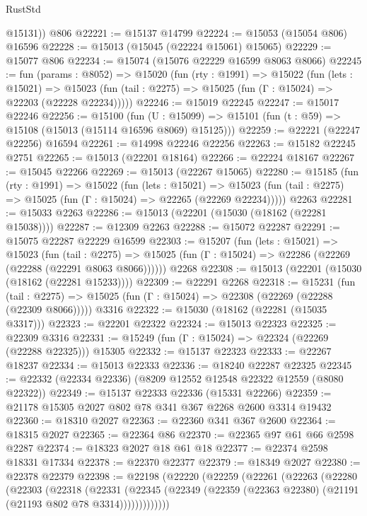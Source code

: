 \begin{lexlean}{RustStd}
\begin{coremodule}
        @15131))
    @806
@22221 := @15137 @14799
@22224 := @15053 (@15054 @806) @16596
@22228 := @15013 (@15045 (@22224 @15061) @15065)
@22229 := @15077 @806
@22234 := @15074 (@15076 @22229 @16599 @8063 @8066)
@22245 := fun (params : @8052) =>
  @15020
    (fun (rty : @1991) =>
    @15022
      (fun (lets : @15021) =>
      @15023 (fun (tail : @2275) => @15025 (fun (Γ : @15024) => @22203 (@22228 @22234)))))
@22246 := @15019 @22245
@22247 := @15017 @22246
@22256 := @15100
    (fun (U : @15099) => @15101 (fun (t : @59) => @15108 (@15013 (@15114 @16596 @8069) @15125)))
@22259 := @22221 (@22247 @22256) @16594
@22261 := @14998 @22246 @22256
@22263 := @15182 @22245 @2751
@22265 := @15013 (@22201 @18164)
@22266 := @22224 @18167
@22267 := @15045 @22266
@22269 := @15013 (@22267 @15065)
@22280 := @15185
    (fun (rty : @1991) =>
    @15022
      (fun (lets : @15021) =>
      @15023 (fun (tail : @2275) => @15025 (fun (Γ : @15024) => @22265 (@22269 @22234)))))
    @2263
@22281 := @15033 @2263
@22286 := @15013 (@22201 (@15030 (@18162 (@22281 @15038))))
@22287 := @12309 @2263
@22288 := @15072 @22287
@22291 := @15075 @22287 @22229 @16599
@22303 := @15207
    (fun (lets : @15021) =>
    @15023
      (fun (tail : @2275) =>
      @15025 (fun (Γ : @15024) => @22286 (@22269 (@22288 (@22291 @8063 @8066))))))
    @2268
@22308 := @15013 (@22201 (@15030 (@18162 (@22281 @15233))))
@22309 := @22291 @2268
@22318 := @15231
    (fun (tail : @2275) => @15025 (fun (Γ : @15024) => @22308 (@22269 (@22288 (@22309 @8066)))))
    @3316
@22322 := @15030 (@18162 (@22281 (@15035 @3317)))
@22323 := @22201 @22322
@22324 := @15013 @22323
@22325 := @22309 @3316
@22331 := @15249 (fun (Γ : @15024) => @22324 (@22269 (@22288 @22325))) @15305
@22332 := @15137 @22323
@22333 := @22267 @18237
@22334 := @15013 @22333
@22336 := @18240 @22287 @22325
@22345 := @22332 (@22334 @22336) (@8209 @12552 @12548 @22322 @12559 (@8080 @22322))
@22349 := @15137 @22333 @22336 (@15331 @22266)
@22359 := @21178 @15305 @2027 @802 @78 @341 @367 @2268 @2600 @3314 @19432
@22360 := @18310 @2027
@22363 := @22360 @341 @367 @2600
@22364 := @18315 @2027
@22365 := @22364 @86
@22370 := @22365 @97 @61 @66 @2598 @2287
@22374 := @18323 @2027 @18 @61 @18
@22377 := @22374 @2598 @18331 @17334
@22378 := @22370 @22377
@22379 := @18349 @2027
@22380 := @22378 @22379
@22398 := @22198
    (@22220
      (@22259
        (@22261
          (@22263
            (@22280
              (@22303
                (@22318
                  (@22331
                    (@22345
                      (@22349 (@22359 (@22363 @22380) (@21191 (@21193 @802 @78 @3314)))))))))))))

\end{coremodule}
\end{lexlean}
